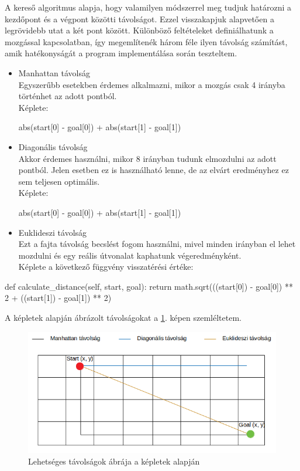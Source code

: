 A kereső algoritmus alapja, hogy valamilyen módszerrel meg tudjuk határozni a kezdőpont és a végpont közötti távolságot. Ezzel visszakapjuk alapvetően a legrövidebb utat a két pont között. Különböző feltételeket definiálhatunk a mozgással kapcsolatban, így megemlítenék három féle ilyen távolság számítást, amik hatékonyságát a program implementálása során teszteltem.
\begin{itemize}
	\item Manhattan távolság\\
	Egyszerűbb esetekben érdemes alkalmazni, mikor a mozgás csak 4 irányba történhet az adott pontból. \\
	Képlete: 
	\begin{python}
	abs(start[0] - goal[0]) + abs(start[1] - goal[1])
	\end{python}
	\item Diagonális távolság\\
	Akkor érdemes használni, mikor 8 irányban tudunk elmozdulni az adott pontból. Jelen esetben ez is használható lenne, de az elvárt eredményhez ez sem teljesen optimális.\\
	Képlete:
	\begin{python}
	abs(start[0] - goal[0]) + abs(start[1] - goal[1])
	\end{python}
	\item Euklideszi távolság\\
	Ezt a fajta távolság becslést fogom használni, mivel minden irányban el lehet mozdulni és egy reális útvonalat kaphatunk végeredményként.\\
	Képlete a következő függvény visszatérési értéke:
\end{itemize}
\begin{python}
    def calculate_distance(self, start, goal):
        return math.sqrt(((start[0]) - goal[0]) ** 2 +
                         ((start[1]) - goal[1]) ** 2)
\end{python}

A képletek alapján ábrázolt távolságokat a  \ref{fig:distances}. képen szemléltetem.

\begin{figure}[h!]
\centering
\includegraphics[scale=0.65]{images/distances.png}
\caption{Lehetséges távolságok ábrája a képletek alapján}
\label{fig:distances}
\end{figure}

